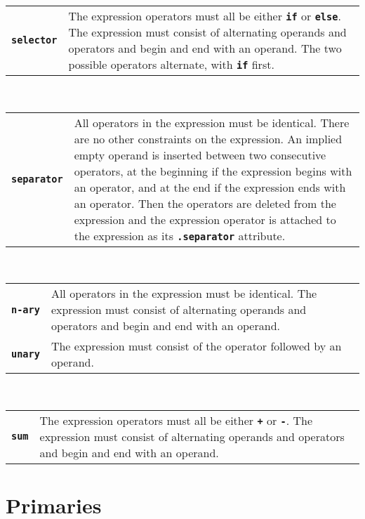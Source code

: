 \documentclass[12pt]{article}
\newcommand{\TT}[1]{{\tt \bfseries #1}}
\newcommand{\ttkey}[1]{{\tt \bfseries #1}}
\begin{document}
\begin{center}
\begin{tabular}{p{1in}p{5.0in}}
\ttkey{selector}
    & The expression operators must all be either \TT{if} or \TT{else}.
      The expression must consist of alternating operands
      and operators and begin and end with an operand.
      The two possible operators alternate, with \TT{if} first.
\end{tabular}
\\[0.5ex]
\begin{tabular}{p{1in}p{5.0in}}
\ttkey{separator}\label{SEPARATOR-FORMAT}
    & All operators in the expression must be identical.
      There are no other constraints on the expression.  An implied empty
      operand is inserted between two consecutive operators,
      at the beginning if the expression begins with an operator,
      and at the end if the expression ends with an operator.
      Then the operators are deleted from the expression and
      the expression operator is attached
      to the expression as its \TT{.separator} attribute.
\end{tabular}
\\[0.5ex]
\begin{tabular}{p{1in}p{5.0in}}
\ttkey{n-ary}
    & All operators in the expression must be identical.
      The expression must consist of alternating operands
      and operators and begin and end with an operand.
\\[1ex]
\ttkey{unary}
    & The expression must consist of
      the operator followed by an operand.
\end{tabular}
\\[0.5ex]
\begin{tabular}{p{1in}p{5.0in}}
\ttkey{sum}
    & The expression operators must all be either \TT{+} or \TT{-}.
      The expression must consist of alternating operands
      and operators and begin and end with an operand.
\end{tabular}
\end{center}

\clearpage

\section{Primaries}
\label{PRIMARIES}
\end{document}
